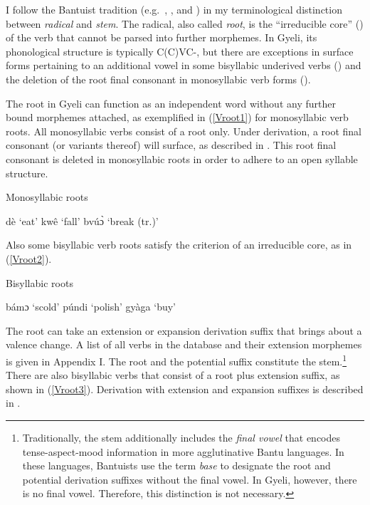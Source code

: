 I follow the Bantuist tradition (e.g.\ \citealt{guthrie71}, \citealt{hyman93}, and  \citealt{schadeberg2003}) in my terminological distinction between  {\itshape radical} and {\itshape stem}. The radical, also called {\itshape root}, is the ``irreducible core'' (\citealt[14]{guthrie71}) of the verb that cannot be parsed into further morphemes. In Gyeli, its phonological structure is typically C(C)VC-, but there are exceptions in surface forms pertaining to an additional vowel in some bisyllabic underived verbs () and the deletion of the root final consonant in monosyllabic verb forms (). 

The root in Gyeli can function as an independent word without any further bound morphemes attached, as exemplified in (\ref{Vroot1}) for monosyllabic verb roots. All monosyllabic verbs consist of a root only. Under derivation, a root final consonant (or variants thereof) will surface, as described in . This root final consonant is deleted in monosyllabic roots in order to adhere to an open syllable structure. 

\begin{exe}
\ex\label{Vroot1} Monosyllabic roots
\begin{xlist}
\ex dè `eat' 
\ex kwê `fall'
\ex bvúɔ̀ `break (tr.)'
\end{xlist}
\end{exe}

\noindent  Also some bisyllabic verb roots satisfy the criterion of an irreducible core, as in (\ref{Vroot2}).


\begin{exe}
\ex\label{Vroot2} Bisyllabic roots
\begin{xlist}
\ex bámɔ `scold' 
\ex púndi `polish'
\ex gyàga `buy'
\end{xlist}
\end{exe}

The root can take an extension or expansion derivation suffix that brings about a valence change. A list of all verbs in the database and their extension morphemes is given in Appendix I. %
  The root and the potential suffix constitute the stem.\footnote{Traditionally, the stem additionally includes the {\itshape final vowel} that encodes tense-aspect-mood information in more agglutinative Bantu languages. In these languages, Bantuists use the term {\itshape base} to designate the root and potential derivation suffixes without the final vowel. In Gyeli, however, there is no final vowel. Therefore, this distinction is not necessary.}
There are also bisyllabic verbs that consist of a root plus extension suffix, as shown in (\ref{Vroot3}). Derivation with extension and expansion suffixes is described in .

